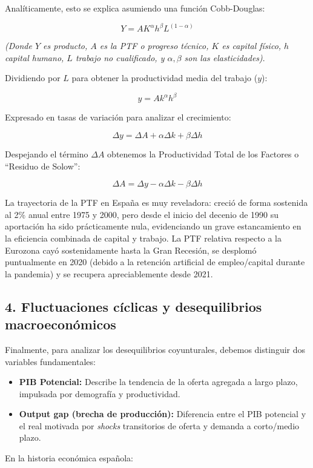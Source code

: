 Analíticamente, esto se explica asumiendo una función Cobb-Douglas:

\[
Y = A K^{\alpha} h^{\beta} L^{(1-\alpha)}
\]

\textit{(Donde $Y$ es producto, $A$ es la PTF o progreso técnico, $K$ es capital físico, $h$ capital humano, $L$ trabajo no cualificado, y $\alpha, \beta$ son las elasticidades)}.

Dividiendo por $L$ para obtener la productividad media del trabajo ($y$):

\[
y = A k^{\alpha} h^{\beta}
\]

Expresado en tasas de variación para analizar el crecimiento:

\[
\Delta y = \Delta A + \alpha\Delta k + \beta\Delta h
\]

Despejando el término $\Delta A$ obtenemos la Productividad Total de los Factores o ``Residuo de Solow'':

\[
\Delta A = \Delta y - \alpha\Delta k - \beta\Delta h
\]

La trayectoria de la PTF en España es muy reveladora: creció de forma sostenida al 2\% anual entre 1975 y 2000, pero desde el inicio del decenio de 1990 su aportación ha sido prácticamente nula, evidenciando un grave estancamiento en la eficiencia combinada de capital y trabajo. La PTF relativa respecto a la Eurozona cayó sostenidamente hasta la Gran Recesión, se desplomó puntualmente en 2020 (debido a la retención artificial de empleo/capital durante la pandemia) y se recupera apreciablemente desde 2021.

\subsection*{4. Fluctuaciones cíclicas y desequilibrios macroeconómicos}

Finalmente, para analizar los desequilibrios coyunturales, debemos distinguir dos variables fundamentales:

\begin{itemize}
  \item \textbf{PIB Potencial:} Describe la tendencia de la oferta agregada a largo plazo, impulsada por demografía y productividad.
  \item \textbf{Output gap (brecha de producción):} Diferencia entre el PIB potencial y el real motivada por \textit{shocks} transitorios de oferta y demanda a corto/medio plazo.
\end{itemize}

En la historia económica española:

